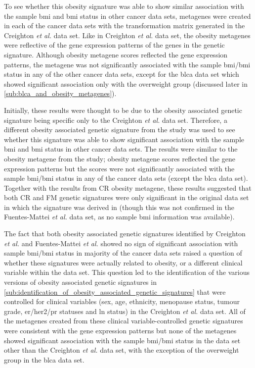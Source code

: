 To see whether this obesity signature was able to show similar association with the sample \gls{bmi} and \gls{bmi} status in other cancer data sets, metagenes were created in each of the cancer data sets with the transformation matrix generated in the Creighton \textit{et al.} data set.
Like in Creighton \textit{et al.} data set, the obesity metagenes were reflective of the gene expression patterns of the genes in the genetic signature.
Although obesity metagene scores reflected the gene expression patterns, the metagene was not significantly associated with the sample \gls{bmi}/\gls{bmi} status in any of the other cancer data sets, except for  the \gls{blca} data set which showed significant association only with the overweight group (discussed later in \cref{sub:blca_and_obesity_metagenes}).

Initially, these results were thought to be due to the obesity associated genetic signature being specific only to the Creighton \textit{et al.} data set.
Therefore, a different obesity associated genetic signature from the \citet{Fuentes-Mattei2014} study was used to see whether this signature was able to show significant association with the sample \gls{bmi} and \gls{bmi} status in other cancer data sets.
The results were similar to the obesity metagene from the \citet{Creighton2012} study; obesity metagene scores reflected the gene expression patterns but the scores were not significantly associated with the sample \gls{bmi}/\gls{bmi} status in any of the cancer data sets (except the \gls{blca} data set).
Together with the results from CR obesity metagene, these results suggested that both CR and FM genetic signatures were only significant in the original data set in which the signature was derived in (though this was not confirmed in the Fuentes-Mattei \textit{et al.} data set, as no sample \gls{bmi} information was available).

The fact that both obesity associated genetic signatures identified by Creighton \textit{et al.} and Fuentes-Mattei \textit{et al.} showed no sign of significant association with sample \gls{bmi}/\gls{bmi} status in majority of the cancer data sets raised a question of whether these signatures were actually related to obesity, or a different clinical variable within the data set.
This question led to the identification of the various versions of obesity associated genetic signatures in \cref{sub:identification_of_obesity_associated_genetic_signatures} that were controlled for clinical variables (sex, age, ethnicity, menopause status, tumour grade, \gls{er}/\gls{her2}/\gls{pr} statuses and \gls{ln} status) in the Creighton \textit{et al.} data set.
All of the metagenes created from these clinical variable-controlled genetic signatures were consistent with the gene expression patterns but none of the metagenes showed significant association with the sample \gls{bmi}/\gls{bmi} status in the data set other than the Creighton \textit{et al.} data set, with the exception of the overweight group in the \gls{blca} data set.

